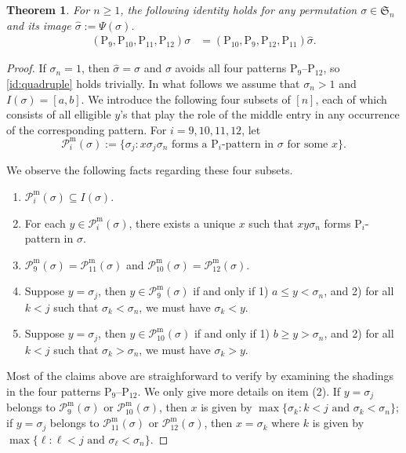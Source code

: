 \documentclass[12pt,reqno]{article}
\numberwithin{equation}{section}
\theoremstyle{plain}
\newtheorem{theorem}{Theorem}[section]
\theoremstyle{definition}
\def\fS{\mathfrak{S}}
\def\rP{\mathrm{P}}
\def\cP{\mathcal{P}}
\begin{document}
\begin{theorem}\label{thm:quadruple}
For $n\ge 1$, the following identity holds for any permutation $\sigma\in\fS_n$ and its image $\hat{\sigma}:=\Psi(\sigma)$.
\begin{align}\label{id:quadruple}
(\rP_9,\rP_{10},\rP_{11},\rP_{12})\sigma &= (\rP_{10},\rP_{9},\rP_{12},\rP_{11})\hat{\sigma}.
\end{align}
\end{theorem}
\begin{proof}
If $\sigma_n=1$, then $\hat{\sigma}=\sigma$ and $\sigma$ avoids all four patterns $\rP_9$--$\rP_{12}$, so \eqref{id:quadruple} holds trivially. In what follows we assume that $\sigma_n>1$ and $I(\sigma)=[a,b]$. We introduce the following four subsets of $[n]$, each of which consists of all elligible $y$'s that play the role of the middle entry in any occurrence of the corresponding pattern. For $i=9,10,11,12$, let
$$\cP_i^{\mathrm{m}}(\sigma):=\{\sigma_j: \text{$x\sigma_j\sigma_n$ forms a $\rP_i$-pattern in $\sigma$ for some $x$}\}.$$

We observe the following facts regarding these four subsets.
\begin{enumerate}
	\item $\cP_i^{\mathrm{m}}(\sigma)\subseteq I(\sigma)$.
	\item For each $y\in \cP_i^{\mathrm{m}}(\sigma)$, there exists a unique $x$ such that $xy\sigma_n$ forms $\rP_i$-pattern in $\sigma$.
	\item $\cP_9^{\mathrm{m}}(\sigma)=\cP_{11}^{\mathrm{m}}(\sigma)$ and $\cP_{10}^{\mathrm{m}}(\sigma)=\cP_{12}^{\mathrm{m}}(\sigma)$.
	\item Suppose $y=\sigma_j$, then $y\in\cP_9^{\mathrm{m}}(\sigma)$ if and only if 1) $a\le y<\sigma_n$, and 2) for all $k<j$ such that $\sigma_k<\sigma_n$, we must have $\sigma_k<y$.
	\item Suppose $y=\sigma_j$, then $y\in\cP_{10}^{\mathrm{m}}(\sigma)$ if and only if 1) $b\ge y>\sigma_n$, and 2) for all $k<j$ such that $\sigma_k>\sigma_n$, we must have $\sigma_k>y$.
\end{enumerate}

Most of the claims above are straighforward to verify by examining the shadings in the four patterns $\rP_9$--$\rP_{12}$. We only give more details on item (2). If $y=\sigma_j$ belongs to $\cP_{9}^{\mathrm{m}}(\sigma)$ or $\cP_{10}^{\mathrm{m}}(\sigma)$, then $x$ is given by $\max\{\sigma_k:\text{$k<j$ and $\sigma_k<\sigma_n$}\}$; if $y=\sigma_j$ belongs to $\cP_{11}^{\mathrm{m}}(\sigma)$ or $\cP_{12}^{\mathrm{m}}(\sigma)$, then $x=\sigma_k$ where $k$ is given by $\max\{\ell:\text{$\ell<j$ and $\sigma_{\ell}<\sigma_n$}\}$.


\end{proof}
\end{document}
